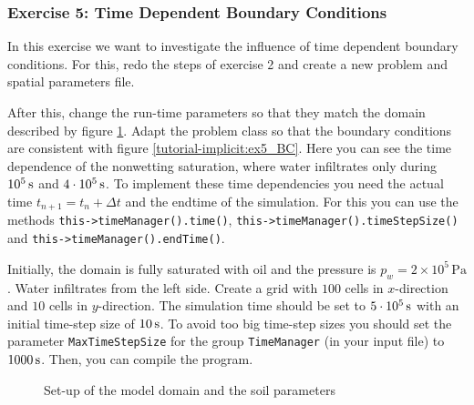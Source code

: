 \subsubsection{Exercise 5: Time Dependent Boundary Conditions}
In this exercise we want to investigate the influence of time dependent boundary
conditions. For this, redo the steps of exercise 2 and create a new problem and
spatial parameters file.

After this, change the run-time parameters so that they match the
domain described by figure \ref{tutorial-implicit:ex5_Domain}. Adapt
the problem class so that the boundary conditions are consistent with
figure \ref{tutorial-implicit:ex5_BC}. Here you can see the time dependence of the
nonwetting saturation, where water infiltrates only during $\unit[10^5]{s}$ and
$\unit[4 \cdot 10^5]{s}$. To implement these time dependencies you need the actual
time $t_{n+1}=t_n + \Delta t$ and the endtime of the simulation. For this you can
use the methods \texttt{this->timeManager().time()}, \texttt{this->timeManager().timeStepSize()}
and \texttt{this->timeManager().endTime()}.

Initially, the domain is fully saturated with oil and the pressure is $p_w = 2 \times
10^5\,\text{Pa}$.  Water infiltrates from the left side. Create a grid
with $100$ cells in $x$-direction and $10$ cells in $y$-direction. The
simulation time should be set to $\unit[5 \cdot 10^5]{s}$ with an
initial time-step size of $\unit[10]{s}$. To avoid too big time-step sizes
you should set the parameter \texttt{MaxTimeStepSize} for the group \texttt{TimeManager}
(in your input file) to $\unit[1000]{s}$.  Then, you can compile the program.

\begin{figure}[ht]
\centering
{}
\caption{Set-up of the model domain and the soil parameters}\label{tutorial-implicit:ex5_Domain}
\end{figure}

